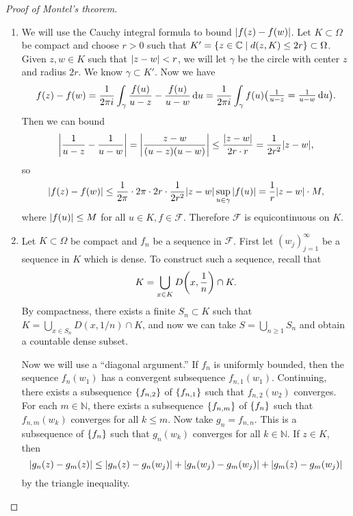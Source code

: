 \documentclass[leqno, openany]{memoir}
\theoremstyle{definition}
\theoremstyle{remark}
\theoremstyle{plain}
\theoremstyle{definition}
\theoremstyle{remark}
\newcommand{\C}{\mathbb{C}}
\newcommand{\N}{\mathbb{N}}
\newcommand{\mc}[1]{\mathcal{#1}}
\begin{document}
\begin{proof}[Proof of Montel's theorem]\leavevmode \begin{enumerate} \item We
    will use the Cauchy integral formula to bound $\abs{f(z) - f(w)}$. Let $K
    \subset \Omega$ be compact and choose $r > 0$ such that $K' = \qty{z \in \C
    \mid d(z,K) \leq 2r} \subset \Omega$. Given $z,w \in K$ such that $\abs{z -
w} < r$, we will let $\gamma$ be the circle with center $z$ and radius $2r$. We
know $\gamma \subset K'$. Now we have \begin{align*} f(z) - f(w) = \frac{1}{2
\pi i} \int_{\gamma} \frac{f(u)}{u-z} - \frac{f(u)}{u-w} \dd{u} = \frac{1}{2
\pi i} \int_{\gamma} f(u) \mqty(\frac{1}{u-z} = \frac{1}{u-w} \dd{u}).
\end{align*} Then we can bound \[ \abs{\frac{1}{u-z} - \frac{1}{u-w}} =
\abs{\frac{z-w}{(u-z)(u-w)}} \leq \frac{\abs{z-w}}{2r \cdot r} = \frac{1}{2r^2}
\abs{z-w}, \] so \[ \abs{f(z) - f(w)} \leq \frac{1}{2\pi} \cdot 2 \pi \cdot 2r
\cdot \frac{1}{2r^2} \abs{z-w} \sup_{u \in \gamma} \abs{f(u)} = \frac{1}{r}
\abs{z-w} \cdot M, \] where $\abs{f(u)} \leq M$ for all $u \in K, f \in
\mc{F}$. Therefore $\mc{F}$ is equicontinuous on $K$.  \item Let $K \subset
\Omega$ be compact and $f_n$ be a sequence in $\mc{F}$. First let
${(w_j)}_{j=1}^{\infty}$ be a sequence in $K$ which is dense. To construct such
a sequence, recall that \[ K = \bigcup_{x \in K} D\qty(x, \frac{1}{n}) \cap K.
\] By compactness, there exists a finite $S_n \subset K$ such that $K =
\bigcup_{x \in S_n} D(x, 1/n) \cap K$, and now we can take $S = \bigcup_{n \geq
1} S_n$ and obtain a countable dense subset. 

            Now we will use a ``diagonal argument.'' If $f_n$ is uniformly
            bounded, then the sequence $f_n(w_1)$ has a convergent subsequence
            $f_{n,1}(w_1)$. Continuing, there exists a subsequence
            $\qty{f_{n,2}}$ of $\qty{f_{n,1}}$ such that $f_{n,2}(w_2)$
            converges. For each $m \in \N$, there exists a subsequence
            $\qty{f_{n,m}}$ of $\qty{f_n}$ such that $f_{n,m}(w_k)$ converges
            for all $k \leq m$. Now take $g_n = f_{n,n}$. This is a subsequence
            of $\qty{f_n}$ such that $g_n(w_k)$ converges for all $k \in \N$.
            If $z \in K$, then \[ \abs{g_n(z) - g_m(z)} \leq \abs{g_n(z) -
            g_n(w_j)} + \abs{g_n(w_j) - g_m(w_j)} + \abs{g_m(z) - g_m(w_j)} \]
            by the triangle inequality. 


\end{enumerate}
\end{proof}
\end{document}
